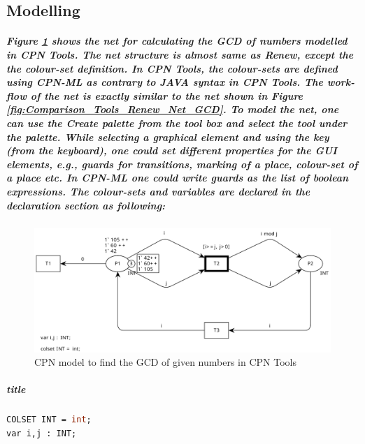 \subsection*{Modelling}
\subparagraph*{\textnormal{Figure \ref{fig:Comparison_Tools_CPN_Net_GCD} shows the net for calculating the GCD of numbers modelled in CPN Tools. The net structure is almost same as Renew, except the the colour-set definition. In CPN Tools, the colour-sets are defined using CPN-ML as contrary to JAVA syntax in CPN Tools. The work-flow of the net is exactly similar to the net shown in Figure \ref{fig:Comparison_Tools_Renew_Net_GCD}. To model the net, one can use the \textit{Create} palette from the tool box and select the tool under the palette. While selecting a graphical element and using the  key (from the keyboard), one could set different properties for the GUI elements, e.g., guards for transitions, marking of a place, colour-set of a place etc. In CPN-ML one could write guards as the list of boolean expressions. The colour-sets and variables are declared in the declaration section as following:}}
\begin{figure}[!htbp]
	\centering
	\includegraphics[scale = 0.5]{Comparison_Tools_CPN_Net_GCD.pdf}
	\caption{CPN model to find the GCD of given numbers in CPN Tools}
	\label{fig:Comparison_Tools_CPN_Net_GCD}
\end{figure}
\subparagraph*{title}
\begin{lstlisting}[language = ML, caption = Colour set and variable declaration, captionpos=b, label = lst:colset_var_dec]
COLSET INT = int;
var i,j : INT;
\end{lstlisting}

